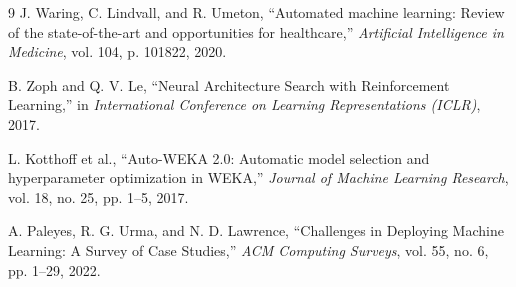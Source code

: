 \begin{thebibliography}{9}
J. Waring, C. Lindvall, and R. Umeton, ``Automated machine learning: Review of the state-of-the-art and opportunities for healthcare,'' \textit{Artificial Intelligence in Medicine}, vol. 104, p. 101822, 2020.

B. Zoph and Q. V. Le, ``Neural Architecture Search with Reinforcement Learning,'' in \textit{International Conference on Learning Representations (ICLR)}, 2017.

L. Kotthoff et al., ``Auto-WEKA 2.0: Automatic model selection and hyperparameter optimization in WEKA,'' \textit{Journal of Machine Learning Research}, vol. 18, no. 25, pp. 1--5, 2017.

A. Paleyes, R. G. Urma, and N. D. Lawrence, ``Challenges in Deploying Machine Learning: A Survey of Case Studies,'' \textit{ACM Computing Surveys}, vol. 55, no. 6, pp. 1--29, 2022.

\end{thebibliography}
